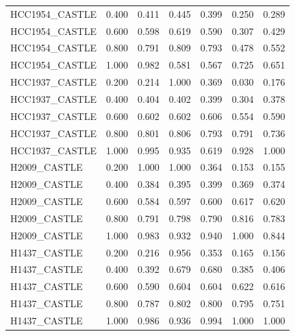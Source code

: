 \documentclass[pdflatex,sn-nature]{sn-jnl}
\begin{document}
\begin{small}
\begin{longtable}{@{}llccccc@{}}
  HCC1954\_CASTLE & 0.400 & 0.411 & 0.445 & 0.399 & 0.250 & 0.289 \\
  HCC1954\_CASTLE & 0.600 & 0.598 & 0.619 & 0.590 & 0.307 & 0.429 \\
  HCC1954\_CASTLE & 0.800 & 0.791 & 0.809 & 0.793 & 0.478 & 0.552 \\
  HCC1954\_CASTLE & 1.000 & 0.982 & 0.581 & 0.567 & 0.725 & 0.651 \\
  \addlinespace
  HCC1937\_CASTLE & 0.200 & 0.214 & 1.000 & 0.369 & 0.030 & 0.176 \\
  HCC1937\_CASTLE & 0.400 & 0.404 & 0.402 & 0.399 & 0.304 & 0.378 \\
  HCC1937\_CASTLE & 0.600 & 0.602 & 0.602 & 0.606 & 0.554 & 0.590 \\
  HCC1937\_CASTLE & 0.800 & 0.801 & 0.806 & 0.793 & 0.791 & 0.736 \\
  HCC1937\_CASTLE & 1.000 & 0.995 & 0.935 & 0.619 & 0.928 & 1.000 \\
  \addlinespace
  H2009\_CASTLE & 0.200 & 1.000 & 1.000 & 0.364 & 0.153 & 0.155 \\
  H2009\_CASTLE & 0.400 & 0.384 & 0.395 & 0.399 & 0.369 & 0.374 \\
  H2009\_CASTLE & 0.600 & 0.584 & 0.597 & 0.600 & 0.617 & 0.620 \\
  H2009\_CASTLE & 0.800 & 0.791 & 0.798 & 0.790 & 0.816 & 0.783 \\
  H2009\_CASTLE & 1.000 & 0.983 & 0.932 & 0.940 & 1.000 & 0.844 \\
  \addlinespace
  H1437\_CASTLE & 0.200 & 0.216 & 0.956 & 0.353 & 0.165 & 0.156 \\
  H1437\_CASTLE & 0.400 & 0.392 & 0.679 & 0.680 & 0.385 & 0.406 \\
  H1437\_CASTLE & 0.600 & 0.590 & 0.604 & 0.604 & 0.622 & 0.616 \\
  H1437\_CASTLE & 0.800 & 0.787 & 0.802 & 0.800 & 0.795 & 0.751 \\
  H1437\_CASTLE & 1.000 & 0.986 & 0.936 & 0.994 & 1.000 & 1.000 \\
\end{longtable}
\end{small}
\end{document}
